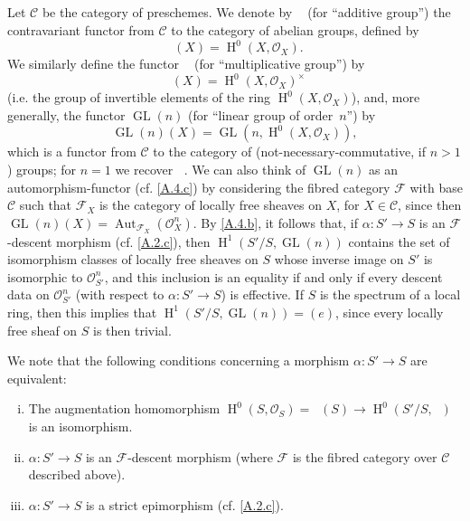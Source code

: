 \documentclass{article}
\theoremstyle{plain}
\theoremstyle{definition}
\newenvironment{example}[1]
  {\renewcommand\theinnercustomexample{#1}\innercustomexample}
  {\endinnercustomexample}
\newcommand{\sh}[1]{{\mathscr{#1}}}
\newcommand{\cat}[1]{{\mathcal{#1}}}
\DeclareMathOperator{\Aut}{Aut}
\DeclareMathOperator{\HH}{H}
\DeclareMathOperator{\GL}{GL}
\DeclareMathOperator{\Ga}{G_a}
\DeclareMathOperator{\Gm}{G_m}
\newcommand{\oldpage}[1]{\marginpar{\footnotesize$\Big\vert$ \textit{p.~#1}}}
\begin{document}
\subsection{}
\label{A.4.e}

\begin{example}{2}
  Let $\cat{C}$ be the category of preschemes.
  We denote by $\Ga$ (for ``additive group'') the contravariant functor from $\cat{C}$ to the category of abelian groups, defined by
  \[
    \Ga(X) = \HH^0(X,\sh{O}_X).
  \]
  We similarly define the functor $\Gm$ (for ``multiplicative group'') by
  \[
    \Gm(X) = \HH^0(X,\sh{O}_X)^\times
  \]
  (i.e. the group of invertible elements of the ring $\HH^0(X,\sh{O}_X)$), and, more generally, the functor $\GL(n)$ (for ``linear group of order~$n$'') by
\oldpage{190-15}
  \[
    \GL(n)(X) = \GL(n,\HH^0(X,\sh{O}_X)),
  \]
  which is a functor from $\cat{C}$ to the category of (not-necessary-commutative, if $n>1$) groups;
  for $n=1$ we recover $\Gm$.
  We can also think of $\GL(n)$ as an automorphism-functor (cf. \cref{A.4.c}) by considering the fibred category $\sh{F}$ with base $\cat{C}$ such that $\sh{F}_X$ is the category of locally free sheaves on $X$, for $X\in\cat{C}$, since then $\GL(n)(X)=\Aut_{\sh{F}_X}(\sh{O}_X^n)$.
  By \cref{A.4.b}, it follows that, if $\alpha\colon S'\to S$ is an $\sh{F}$-descent morphism (cf. \cref{A.2.c}), then $\HH^1(S'/S,\GL(n))$ contains the set of isomorphism classes of locally free sheaves on $S$ whose inverse image on $S'$ is isomorphic to $\sh{O}_{S'}^n$, and this inclusion is an equality if and only if every descent data on $\sh{O}_{S'}^n$ (with respect to $\alpha\colon S'\to S$) is effective.
  If $S$ is the spectrum of a local ring, then this implies that $\HH^1(S'/S,\GL(n))=(e)$, since every locally free sheaf on $S$ is then trivial.

  We note that the following conditions concerning a morphism $\alpha\colon S'\to S$ are equivalent:
  \begin{enumerate}[(i)]
    \item The augmentation homomorphism $\HH^0(S,\sh{O}_S) = \Ga(S)\to\HH^0(S'/S,\Ga)$ is an isomorphism.
    \item $\alpha\colon S'\to S$ is an $\sh{F}$-descent morphism (where $\sh{F}$ is the fibred category over $\cat{C}$ described above).
    \item $\alpha\colon S'\to S$ is a strict epimorphism (cf. \cref{A.2.c}).
  \end{enumerate}


\end{example}
\end{document}
